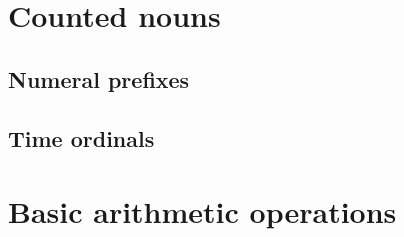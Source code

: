 \section{Counted nouns} \label{sec:counted.nouns}
\subsection{Numeral prefixes} \label{sec:numeral.prefixes}
\subsection{Time ordinals} \label{sec:time.ordinals}

\section{Basic arithmetic operations} \label{sec:arithmetic}
